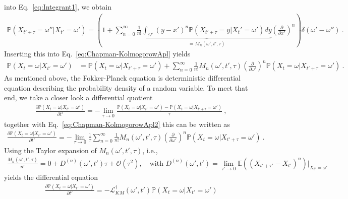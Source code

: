 \documentclass[11pt,a4paper]{article}
\numberwithin{equation}{section}
\begin{document}
into Eq.~\eqref{eq:Integrant1}, we obtain
\begin{align*}
\mathbb{P}(X_{t'+\tau}=\omega''|X_{t'}=\omega')
=
\left(
1+\sum_{n=0}^{\infty}\frac{1}{n!}
\underbrace{\int_{\Omega'}(y-x')^n\mathbb{P}(X_{t'+\tau}=y|X_t'=\omega')dy}_{=M_n(\omega',t',\tau)}\left( \frac{\partial}{\partial x'} \right)^n
\right)\delta(\omega'-\omega'')~.
\end{align*}
Inserting this into Eq.~\eqref{eq:Chapman-KolmogorowApl} yields
\begin{align*}
\label{eq:Chapman-KolmogorowApl2}
\mathbb{P}(X_{t}=\omega|X_{t'}=\omega')
&=
\mathbb{P}(X_{t}=\omega|X_{t'+\tau}=\omega')
+\sum_{n=0}^{\infty}\frac{1}{n!}M_n(\omega',t',\tau)\left( \frac{\partial}{\partial \omega'} \right)^n
\mathbb{P}(X_{t}=\omega|X_{t'+\tau}=\omega')~.
\end{align*}
As mentioned above, the Fokker-Planck equation is deterministic differential equation describing the probability density of a random variable. To meet that end, we take a closer look a differential quotient
\begin{align*}
\frac{\partial \mathbb{P}(X_{t}=\omega|X_{t'}=\omega')}{\partial t'}
=
-\lim_{\tau\to 0} \frac{\mathbb{P}(X_{t}=\omega|X_{t'}=\omega')-\mathbb{P}(X_{t}=\omega|X_{t'+\tau}=\omega')}{\tau}~,
\end{align*}
together with Eq.~\eqref{eq:Chapman-KolmogorowApl2} this can be written as
\begin{align*}
\frac{\partial \mathbb{P}(X_{t}=\omega|X_{t'}=\omega')}{\partial t'}
=
-\lim_{\tau\to 0} \frac{1}{\tau}\sum_{n=0}^{\infty}\frac{1}{n!}M_n(\omega',t',\tau)\left( \frac{\partial}{\partial \omega'} \right)^n
\mathbb{P}(X_{t}=\omega|X_{t'+\tau}=\omega')~.
\end{align*}
Using the Taylor expansion of $M_n(\omega',t',\tau)$, i.e.,
\begin{align*}
\frac{M_n(\omega',t',\tau)}{n!} = 0+D^{(n)}(\omega',t')\tau+\mathcal{O}(\tau^2),\quad\text{with } D^{(n)}(\omega',t') = \lim_{\tau'\to 0}\mathbb{E}((X_{t'+\tau'}-X_{t'})^n)\big|_{X_{t'}=\omega'}
\end{align*}
yields the differential equation
\begin{align}
\label{eq:Fokker-Planck-Prob}
\frac{\partial \mathbb{P}(X_{t}=\omega|X_{t'}=\omega')}{\partial t'}
=
-\mathcal{L}_{KM}^{\dagger}(\omega',t')\mathbb{P}(X_{t}=\omega|X_{t'}=\omega')
\end{align}
\end{document}
